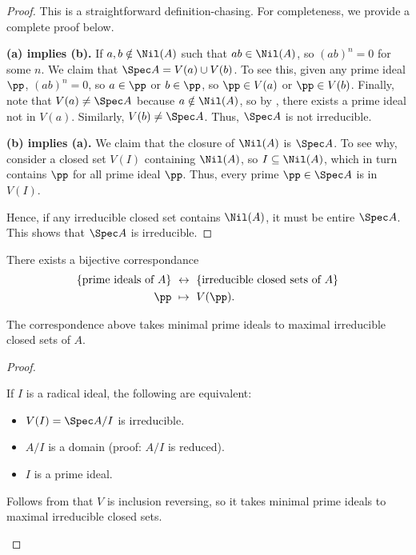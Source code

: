 \begin{proof}
    This is a straightforward definition-chasing.
    For completeness, we provide a complete proof below.
    
    \textbf{(a) implies (b).}
    If $a,b\notin \Nil(A)$ such that $ab\in\Nil(A)$,
    so $(ab)^n=0$ for some $n$.
    We claim that $\Spec A = V(a)\cup V(b)$.
    To see this, given any prime ideal $\pp$,
    $(ab)^n=0$, so $a\in\pp$ or $b\in\pp$,
    so $\pp\in V(a)$ or $\pp\in V(b)$.
    Finally, note that $V(a)\neq \Spec A$
    because $a\notin\Nil(A)$, so by ,
    there exists a prime ideal not in $V(a)$.
    Similarly, $V(b)\neq\Spec A$. Thus, $\Spec A$
    is not irreducible.

    \textbf{(b) implies (a).}
    We claim that the closure of $\Nil(A)$ is $\Spec A$.
    To see why, consider a closed set $V(I)$ containing $\Nil(A)$,
    so $I\subseteq \Nil(A)$, which in turn contains $\pp$
    for all prime ideal $\pp$. Thus, every prime 
    $\pp\in\Spec A$ is in $V(I)$.

    Hence, if any irreducible closed set contains $\Nil(A)$,
    it must be entire $\Spec A$.
    This shows that $\Spec A$ is irreducible.
\end{proof}
\begin{corollary}
    \label{cor:prime_ideal_irreducible_closed_sets}
    \begin{alphenum}
    \item There exists a bijective correspondance
    \begin{align*}
        \{\text{prime ideals of }A\} 
        &\ \leftrightarrow\ \{\text{irreducible closed sets of }A\} \\
        \pp &\ \mapsto\ V(\pp).
    \end{align*}
    \item The correspondence above takes minimal prime ideals
    to maximal irreducible closed sets of $A$.
    \end{alphenum}
\end{corollary}
\begin{proof}
    \begin{alphenum}
    \item If $I$ is a radical ideal, the following are equivalent:
    \begin{itemize}
        \item $V(I) = \Spec A/I$ is irreducible.
        \item $A/I$ is a domain (proof: $A/I$ is reduced).
        \item $I$ is a prime ideal.
    \end{itemize}
    \item Follows from that $V$ is inclusion reversing,
    so it takes minimal prime ideals to
    maximal irreducible closed sets. \qedhere
    \end{alphenum}
\end{proof}
